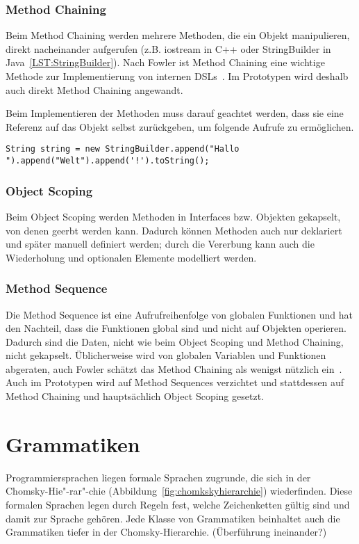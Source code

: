 \documentclass[../InterneDSLs.tex]{subfiles}
\begin{document}
\subsection{Method Chaining}
Beim Method Chaining werden mehrere Methoden, die ein Objekt manipulieren, direkt nacheinander aufgerufen (z.B. iostream in C++ oder StringBuilder in Java~\ref{LST:StringBuilder}). Nach Fowler ist Method Chaining eine wichtige Methode zur Implementierung von internen DSLs~\cite[S.~373]{Fowler.2010}. Im Prototypen wird deshalb auch direkt Method Chaining angewandt.

Beim Implementieren der Methoden muss darauf geachtet werden, dass sie eine Referenz auf das Objekt selbst zurückgeben, um folgende Aufrufe zu ermöglichen.

\begin{lstlisting}[label=LST:StringBuilder,caption={Method Chaining beim StringBuilder}]
String string = new StringBuilder.append("Hallo ").append("Welt").append('!').toString();
\end{lstlisting}

\subsection{Object Scoping}
Beim Object Scoping werden Methoden in Interfaces bzw. Objekten gekapselt, von denen geerbt werden kann. Dadurch können Methoden auch nur deklariert und später manuell definiert werden; durch die Vererbung kann auch die Wiederholung und optionalen Elemente modelliert werden.

\subsection{Method Sequence}
Die Method Sequence ist eine Aufrufreihenfolge von globalen Funktionen und hat den Nachteil, dass die Funktionen global sind und nicht auf Objekten operieren. Dadurch sind die Daten, nicht wie beim Object Scoping und Method Chaining, nicht gekapselt. Üblicherweise wird von globalen Variablen und Funktionen abgeraten, auch Fowler schätzt das Method Chaining als wenigst nützlich ein~\cite[S. 352]{Fowler.2010}. Auch im Prototypen wird auf Method Sequences verzichtet und stattdessen auf Method Chaining und hauptsächlich Object Scoping gesetzt.

\chapter{Grammatiken}\label{SEC:Grammars}
Programmiersprachen liegen formale Sprachen zugrunde, die sich in der Chomsky-Hie"-rar"-chie (Abbildung~\ref{fig:chomkskyhierarchie}) wiederfinden. Diese formalen Sprachen legen durch Regeln fest, welche Zeichenketten gültig sind und damit zur Sprache gehören. Jede Klasse von Grammatiken beinhaltet auch die Grammatiken tiefer in der Chomsky-Hierarchie. (Überführung ineinander?)
\end{document}

